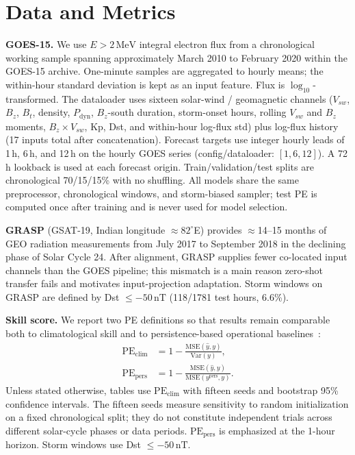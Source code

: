 \documentclass[conference]{IEEEtran}
\begin{document}
\section{Data and Metrics}
\textbf{GOES-15.} We use \(E>2\,\mathrm{MeV}\) integral electron flux from a
chronological working sample spanning approximately March 2010 to February 2020
within the GOES-15 archive. One-minute samples are aggregated to hourly means;
the within-hour standard deviation is kept as an input feature. Flux is
\(\log_{10}\)-transformed. The dataloader uses sixteen solar-wind /
geomagnetic channels
(\(V_{sw}\), \(B_z\), \(B_t\), density, \(P_{\mathrm{dyn}}\),
\(B_z\)-south duration, storm-onset hours, rolling \(V_{sw}\) and \(B_z\)
moments, \(B_z\times V_{sw}\), Kp, Dst, and within-hour log-flux std)
plus log-flux history (17 inputs total after concatenation). Forecast targets use integer hourly leads of 1\,h, 6\,h, and 12\,h on the hourly GOES series (config/dataloader: $[1,6,12]$). A 72\,h lookback is used at
each forecast origin. Train/validation/test splits are chronological
70/15/15\% with no shuffling. All models share the same preprocessor, chronological windows, and storm-biased sampler; test PE is computed once after training and is never used for model selection.

\textbf{GRASP} (GSAT-19, Indian longitude \(\approx82^\circ\)E) provides
$\approx$14--15 months of GEO radiation measurements from July 2017 to September 2018 in
the declining phase of Solar Cycle 24. After alignment, GRASP supplies fewer
co-located input channels than the GOES pipeline; this mismatch is a main
reason zero-shot transfer fails and motivates input-projection adaptation.
Storm windows on GRASP are defined by Dst \(\le -50\,\mathrm{nT}\)
(118/1781 test hours, 6.6\%).

\textbf{Skill score.} We report two PE definitions so that results remain comparable both to climatological skill and to persistence-based operational baselines~\cite{b12}:
\begin{align}
\mathrm{PE}_{\mathrm{clim}} &= 1 - \frac{\mathrm{MSE}(\hat y,y)}{\mathrm{Var}(y)}, \\
\mathrm{PE}_{\mathrm{pers}} &= 1 - \frac{\mathrm{MSE}(\hat y,y)}{\mathrm{MSE}(y^{\mathrm{pers}},y)}.
\end{align}
Unless stated otherwise, tables use \(\mathrm{PE}_{\mathrm{clim}}\) with fifteen seeds and bootstrap 95\% confidence intervals. The fifteen seeds measure sensitivity to random initialization on a fixed chronological split; they do not constitute independent trials across different solar-cycle phases or data periods. \(\mathrm{PE}_{\mathrm{pers}}\) is emphasized at the 1-hour horizon. Storm windows use Dst \(\le -50\,\mathrm{nT}\).
\end{document}

